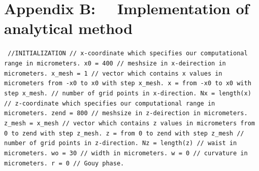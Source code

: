 \documentclass[a4paper]{article}
\begin{document}
	\section*{Appendix B: ~~Implementation of analytical method}
	\texttt{\noindent
		\textcolor{OliveGreen}{//INITIALIZATION\newline\newline
		// x-coordinate which specifies our computational range in micrometers}.\newline
		x0 = 400 \newline
		\textcolor{OliveGreen}{// meshsize in x-deirection in micrometers.}\newline
		x\_mesh = 1 \newline
		\textcolor{OliveGreen}{// vector which contains x values in micrometers from -x0 to x0 with step x\_mesh.}\newline
		x = from -x0 to x0 with step x\_mesh.\newline
		\textcolor{OliveGreen}{// number of grid points in x-direction.}\newline
		Nx = length(x)\newline
		\textcolor{OliveGreen}{// z-coordinate which specifies our computational range in micrometers.}\newline
		zend = 800 \newline
		\textcolor{OliveGreen}{// meshsize in z-deirection in micrometers.}\newline
		z\_mesh = x\_mesh \newline
		\textcolor{OliveGreen}{// vector which contains z values in micrometers from 0 to zend with step z\_mesh.}\newline
		z = from 0 to zend with step z\_mesh\newline
		\textcolor{OliveGreen}{// number of grid points in z-direction.}\newline
		Nz = length(z)\newline
		\textcolor{OliveGreen}{// waist in micrometers.}\newline
		wo = 30 \newline
		\textcolor{OliveGreen}{// width in micrometers.}\newline
		w = 0 \newline
		\textcolor{OliveGreen}{// curvature in micrometers.}\newline
		r = 0 \newline
		\textcolor{OliveGreen}{// Gouy phase.}\newline
}
\end{document}
